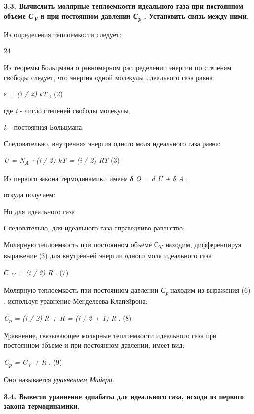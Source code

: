 \textbf{3.3. Вычислить молярные теплоемкости идеального газа при
постоянном объеме \emph{С\textsubscript{V}} и при постоянном давлении
\emph{С\textsubscript{p}} . Установить связь между ними.}

\solving{}

Из определения теплоемкости следует:


24

Из теоремы Больцмана о равномерном распределении энергии по степеням
свободы следует, что энергия одной молекулы идеального газа равна:

\emph{ε = (i / 2) kT} , (2)

где \emph{i} - число степеней свободы молекулы,

\emph{k} - постоянная Больцмана.

Следовательно, внутренняя энергия одного моля идеального газа равна:

\emph{U = N\textsubscript{A} ⋅ (i / 2) kT = (i / 2) RT} (3)

Из первого закона термодинамики имеем \emph{δ Q = d U + δ A} ,

откуда получаем: %

Но для идеального газа %

Следовательно, для идеального газа справедливо равенство:


Молярную теплоемкость при постоянном объеме С\textsubscript{V} находим,
дифференцируя выражение (3) для внутренней энергии одного моля
идеального газа:

\emph{С \textsubscript{V} = (i / 2) R} . (7)

Молярную теплоемкость при постоянном давлении \emph{С\textsubscript{p}}
находим из выражения (6) , используя уравнение Менделеева-Клапейрона:

\emph{C\textsubscript{p} = (i / 2) R + R = (i / 2 + 1) R} . (8)

Уравнение, связывающее молярные теплоемкости идеального газа при
постоянном объеме и при постоянном давлении, имеет вид:

\emph{C\textsubscript{p} = C\textsubscript{V} + R} . (9)

Оно называется \emph{уравнением Майера}.

\textbf{3.4. Вывести уравнение адиабаты для идеального газа, исходя из
первого закона термодинамики.}

